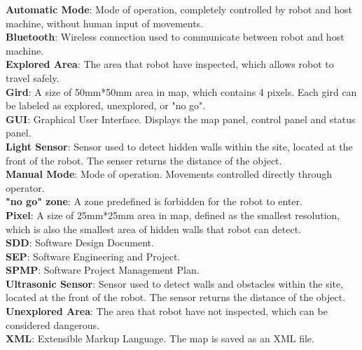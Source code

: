 \documentclass[11pt, a4paper]{report}
\begin{document}
\textbf{Automatic Mode}:  Mode of operation, completely controlled by robot and host machine, without human input of movements. 
\\ \textbf{Bluetooth}: Wireless connection used to communicate between robot and host machine.
\\ \textbf{Explored Area}: The area that robot have inspected, which allows robot to travel safely.  
\\ \textbf{Gird}: A size of 50mm*50mm area in map, which contains 4 pixels. Each gird can be labeled as explored, unexplored, or "no go".
\\ \textbf{GUI}: Graphical User Interface. Displays the map panel, control panel and status panel.
\\ \textbf{Light Sensor}: Sensor used to detect hidden walls within the site, located at the front of the robot. The senser returns the distance of the object.
\\ \textbf{Manual Mode}: Mode of operation. Movements controlled directly through operator.
\\ \textbf{"no go" zone}: A zone predefined is forbidden for the robot to enter. 
\\ \textbf{Pixel}: A size of 25mm*25mm area in map, defined as the smallest resolution, which is also the smallest area of hidden walls that robot can detect.  
\\ \textbf{SDD}: Software Design Document.
\\ \textbf{SEP}: Software Engineering and Project.
\\ \textbf{SPMP}: Software Project Management Plan.
\\ \textbf{Ultrasonic Sensor}: Sensor used to detect walls and obstacles within the site, located at the front of the robot. The sensor returns the distance of the object.
\\ \textbf{Unexplored Area}: The area that robot have not inspected, which can be considered dangerous.  
\\ \textbf{XML}: Extensible Markup Language. The map is saved as an XML file.
\end{document}
